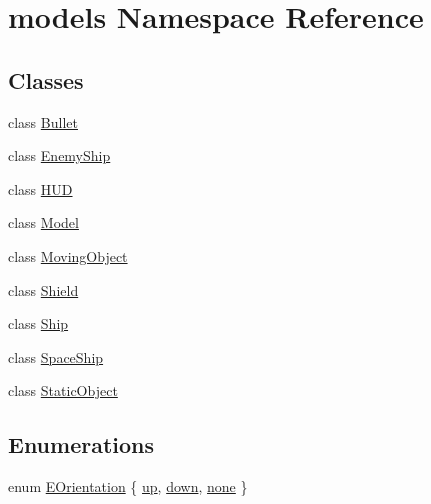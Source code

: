 \hypertarget{namespacemodels}{\section{models \-Namespace \-Reference}
\label{d7/d95/namespacemodels}
}
\subsection*{\-Classes}
\begin{DoxyCompactItemize}
\item 
class \hyperlink{classmodels_1_1Bullet}{\-Bullet}
\item 
class \hyperlink{classmodels_1_1EnemyShip}{\-Enemy\-Ship}
\item 
class \hyperlink{classmodels_1_1HUD}{\-H\-U\-D}
\item 
class \hyperlink{classmodels_1_1Model}{\-Model}
\item 
class \hyperlink{classmodels_1_1MovingObject}{\-Moving\-Object}
\item 
class \hyperlink{classmodels_1_1Shield}{\-Shield}
\item 
class \hyperlink{classmodels_1_1Ship}{\-Ship}
\item 
class \hyperlink{classmodels_1_1SpaceShip}{\-Space\-Ship}
\item 
class \hyperlink{classmodels_1_1StaticObject}{\-Static\-Object}
\end{DoxyCompactItemize}
\subsection*{\-Enumerations}
\begin{DoxyCompactItemize}
\item 
enum \hyperlink{namespacemodels_adec64ede5178a8b8fed882b3790d423d}{\-E\-Orientation} \{ \hyperlink{namespacemodels_adec64ede5178a8b8fed882b3790d423da00779686fef3241b4c47e6ea5f4e9725}{up}, 
\hyperlink{namespacemodels_adec64ede5178a8b8fed882b3790d423daf5fc461da1ad7e0ac10ac916e61e37b1}{down}, 
\hyperlink{namespacemodels_adec64ede5178a8b8fed882b3790d423da5506c07d2c664497722fa424805edcbf}{none}
 \}
\end{DoxyCompactItemize}


